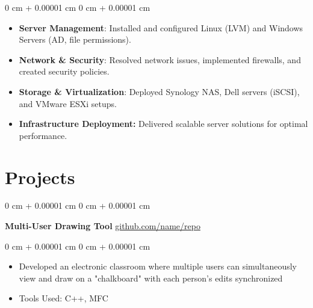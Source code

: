 \documentclass[10pt, letterpaper]{article}
\newenvironment{highlights}{
    \begin{itemize}[
        topsep=0.10 cm,
        parsep=0.10 cm,
        partopsep=0pt,
        itemsep=0pt,
        leftmargin=0 cm + 10pt
    ]
}{
    \end{itemize}
} %
\newenvironment{onecolentry}{
    \begin{adjustwidth}{
        0 cm + 0.00001 cm
    }{
        0 cm + 0.00001 cm
    }
}{
    \end{adjustwidth}
} %
\newenvironment{twocolentry}[2][]{
    \onecolentry
    \def\secondColumn{#2}
    \setcolumnwidth{\fill, 4.5 cm}
    \begin{paracol}{2}
}{
    \switchcolumn \raggedleft \secondColumn
    \end{paracol}
    \endonecolentry
} %
\begin{document}
        \vspace{0.18 cm}
        \begin{onecolentry}
            \begin{highlights}
                \item 

\textbf{Server Management}: Installed and configured Linux (LVM) and Windows Servers (AD, file permissions).
                \item 

\textbf{Network \& Security}: Resolved network issues, implemented firewalls, and created security policies.
                \item

\textbf{Storage \& Virtualization}: Deployed Synology NAS, Dell servers (iSCSI), and VMware ESXi setups.
                \item 
\textbf{Infrastructure Deployment: }Delivered scalable server solutions for optimal performance.
            \end{highlights}
        \end{onecolentry}


\vspace{0.2 cm}
    

    \section{Projects}



        
        \begin{twocolentry}{
            \href{https://github.com/sinaatalay/rendercv}{github.com/name/repo}
        }
            \textbf{Multi-User Drawing Tool}\end{twocolentry}

        \vspace{0.10 cm}
        \begin{onecolentry}
            \begin{highlights}
                \item Developed an electronic classroom where multiple users can simultaneously view and draw on a "chalkboard" with each person's edits synchronized
                \item Tools Used: C++, MFC
            \end{highlights}
        \end{onecolentry}


        \vspace{0.2 cm}
\end{document}
